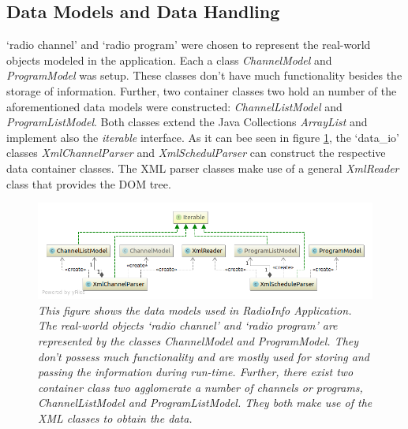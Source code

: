 \documentclass[a4paper,11pt,twoside]{article}
\begin{document}
\subsection{Data Models and Data Handling}
`radio channel' and `radio program' were chosen to represent the real-world objects modeled in the application. Each a class \textit{ChannelModel} and \textit{ProgramModel} was setup. These classes don't have much functionality besides the storage of information. Further, two container classes two hold an number of the aforementioned data models were constructed: \textit{ChannelListModel} and \textit{ProgramListModel}. Both classes extend the Java Collections \textit{ArrayList} and implement also the \textit{iterable} interface. As it can bee seen in figure \ref{fig:dataModels}, the `data\_io' classes \textit{XmlChannelParser} and \textit{XmlSchedulParser} can construct the respective data container classes. The XML parser classes make use of a general \textit{XmlReader} class that provides the DOM tree. 

\begin{figure}[p]
  \centering
  \includegraphics[width=1\textwidth]{dataModelsUML.png}
  \caption{\textit{This figure shows the data models used in RadioInfo Application. The real-world objects `radio channel' and `radio program' are represented by the classes \textit{ChannelModel} and \textit{ProgramModel}. They don't possess much functionality and are mostly used for storing and passing the information during run-time. Further, there exist two container class two agglomerate a number of channels or programs, \textit{ChannelListModel} and \textit{ProgramListModel}. They both make use of the XML classes to obtain the data.}}
  \label{fig:dataModels}
\end{figure}
\end{document}
